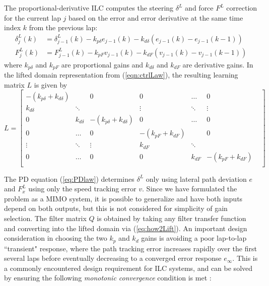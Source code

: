 The proportional-derivative ILC computes the steering $\delta^L$ and force $F^L$ correction for the current lap $j$ based on the error and 
error derivative at the same time index $k$ from the previous lap:
\begin{align}
	\label{eq:PDlaw}
	\delta^L_{j}(k) &= \delta^L_{j\!-\!1}(k) - k_{p\delta}e_{j\!-\!1}(k) - k_{d\delta}(e_{j\!-\!1}(k) - e_{j\!-\!1}(k-1))\\
	    F^L_{j}(k) &=  F^L_{j-1}(k) - k_{pF}v_{j\!-\!1}(k) - k_{dF}(v_{j\!-\!1}(k) - v_{j\!-\!1}(k-1))
\end{align}
where $k_{p\delta}$ and $k_{pF}$ are proportional gains and $k_{d\delta}$ and $k_{dF}$ are derivative gains. In the lifted domain representation from (\ref{eqn:ctrlLaw}), the resulting learning matrix $L$ is given by
\begin{equation}
	L = \begin{bmatrix} 		-(k_{p\delta}+k_{d\delta}) &          &  0                            & 0 & \hdots & 0 \\ 
									   k_{d\delta}                     &  \ddots  &                               & \vdots & \ddots & \vdots\\ 
									   0                       &   k_{d\delta}    &    -(k_{p\delta}+k_{d\delta}) & 0 & \hdots & 0 \\
						               0 & \hdots & 0 & -(k_{pF}+k_{dF}) &          &  0\\
									   \vdots & \ddots & \vdots & k_{dF} &  \ddots  &                               &\\
									   0 & \hdots & 0  & 0 & k_{dF} & -(k_{pF} + k_{dF}) \\			
			\end{bmatrix}
\end{equation}
 
 The PD equation (\ref{eq:PDlaw}) determines $\delta^L$ only using lateral path deviation $e$ and $F^L_x$ using only the speed tracking error $v$. Since
 we have formulated the problem as a MIMO system, it is possible to generalize and have both inputs depend on both outputs, but this is not considered for 
 simplicity of gain selection. The filter matrix $Q$ is obtained by taking any filter transfer function and converting into the lifted domain via (\ref{eq:how2Lift}).
 An important design consideration in choosing the two $k_p$ and $k_d$ gains is avoiding a poor lap-to-lap
``transient" response, where the path tracking error increases rapidly over the first several laps before
eventually decreasing to a converged error response $e_\infty$. This is a commonly encountered design requirement
for ILC systems, and can be solved by ensuring the following \textit{monotonic convergence} condition is met \cite{bristow}:

